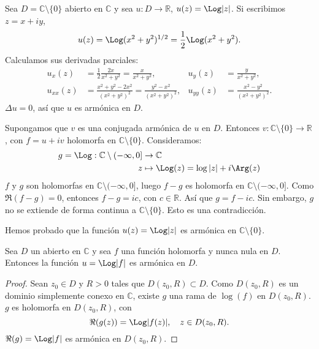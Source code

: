 \begin{example}[Contraejemplo]
    Sea $D = \mathbb{C} \setminus \{0\}$ abierto en $\mathbb{C}$ y sea $u: D \to \mathbb{R}$, $u(z) = \Log|z|$.
    Si escribimos $z = x +iy$,
    $$u(z) = \Log(x^2 + y^2)^{1/2} = \frac{1}{2}\Log(x^2+y^2).$$
    Calculamos sus derivadas parciales:
    \begin{align*}
        u_x(z)    & = \frac{1}{2} \frac{2x}{x^2+y^2} = \frac{x}{x^2+y^2},             & u_y(z)    & = \frac{y}{x^2+y^2},           \\
        u_{xx}(z) & = \frac{x^2+y^2-2x^2}{(x^2+y^2)^2} = \frac{y^2-x^2}{(x^2+y^2)^2}, & u_{yy}(z) & = \frac{x^2-y^2}{(x^2+y^2)^2}.
    \end{align*}
    $\Delta u = 0$, así que $u$ es armónica en $D$.

    Supongamos que $v$ es una conjugada armónica de $u$ en $D$.
    Entonces $v: \mathbb{C} \setminus \{0\} \to \mathbb{R}$, con $f = u + iv$ holomorfa en $\mathbb{C} \setminus \{0\}$.
    Consideramos:
    \begin{align*}
        g = \Log: \mathbb{C} \setminus (-\infty, 0] & \to \mathbb{C}                       \\
        z                                           & \mapsto \Log(z) = \log|z| + i\Arg(z)
    \end{align*}
    $f$ y $g$ son holomorfas en $\mathbb{C} \setminus (-\infty, 0]$, luego $f-g$ es holomorfa en $\mathbb{C} \setminus (-\infty, 0]$.
    Como $\Re(f-g) = 0$, entonces $f-g = ic$, con $c \in \mathbb{R}$.
    Así que $g = f - ic$.
    Sin embargo, $g$ no se extiende de forma continua a $\mathbb{C} \setminus \{0\}$.
    Esto es una contradicción.
\end{example}

Hemos probado que la función $u(z) = \Log|z|$ es armónica en $\mathbb{C} \setminus \{0\}$.

\begin{lemma}
    Sea $D$ un abierto en $\mathbb{C}$ y sea $f$ una función holomorfa y nunca nula en $D$.
    Entonces la función $u = \Log|f|$ es armónica en $D$.
\end{lemma}

\begin{proof}
    Sean $z_0 \in D$ y $R > 0$ tales que $D(z_0, R) \subset D$.
    Como $D(z_0, R)$ es un dominio simplemente conexo en $\mathbb{C}$, existe $g$ una rama de $\log(f)$ en $D(z_0, R)$.
    $g$ es holomorfa en $D(z_0, R)$, con
    $$\Re(g(z)) = \Log|f(z)|, \quad z \in D(z_0, R).$$
    $\Re(g) = \Log|f|$ es armónica en $D(z_0, R)$.
\end{proof}

